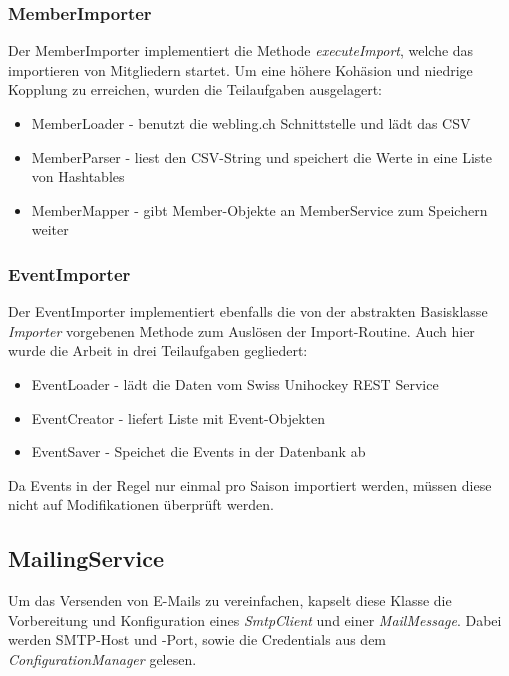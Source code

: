 		\subsubsection{MemberImporter}
			Der MemberImporter implementiert die Methode \textit{executeImport}, welche das importieren von Mitgliedern startet. Um eine höhere Kohäsion und niedrige Kopplung zu erreichen, wurden die Teilaufgaben ausgelagert:
			\\\begin{itemize}	
				\item MemberLoader - benutzt die webling.ch Schnittstelle und lädt das CSV
				\item MemberParser - liest den CSV-String und speichert die Werte in eine Liste von Hashtables
				\item MemberMapper - gibt Member-Objekte an MemberService zum Speichern weiter\\
			\end{itemize}



		\subsubsection{EventImporter}
			Der EventImporter implementiert ebenfalls die von der abstrakten Basisklasse \textit{Importer} vorgebenen Methode zum Auslösen der Import-Routine. Auch hier wurde die Arbeit in drei Teilaufgaben gegliedert:
			\\\begin{itemize}	
				\item EventLoader - lädt die Daten vom Swiss Unihockey REST Service
				\item EventCreator - liefert Liste mit Event-Objekten
				\item EventSaver - Speichet die Events in der Datenbank ab\\
			\end{itemize}
	
			\noindent
			Da Events in der Regel nur einmal pro Saison importiert werden, müssen diese nicht auf Modifikationen überprüft werden.
	
	\subsection{MailingService}
		Um das Versenden von E-Mails zu vereinfachen, kapselt diese Klasse die Vorbereitung und Konfiguration eines \textit{SmtpClient} und einer \textit{MailMessage}. Dabei werden SMTP-Host und -Port, sowie die Credentials aus dem \textit{ConfigurationManager} gelesen.  

